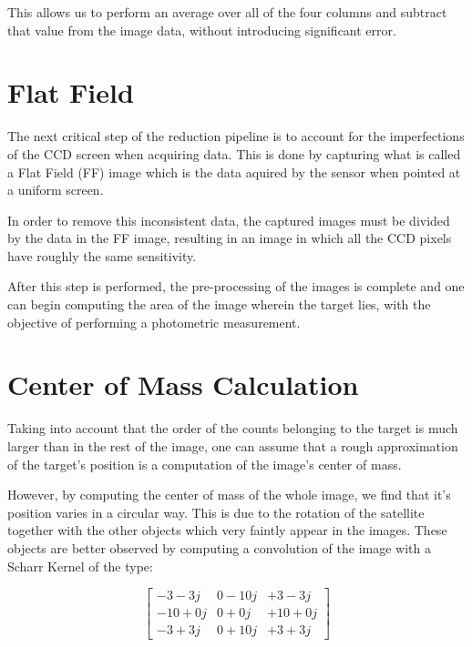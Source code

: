 \documentclass{aa}
\begin{document}
This allows us to perform an average over all of the four columns and subtract that value from the image data, without introducing significant error.

\section{Flat Field}

The next critical step of the reduction pipeline is to account for the imperfections of the CCD screen when acquiring data. This is done by capturing what is called a Flat Field (FF) image which is the data aquired by the sensor when pointed at a uniform screen.

In order to remove this inconsistent data, the captured images must be divided by the data in the FF image, resulting in an image in which all the CCD pixels have roughly the same sensitivity.

After this step is performed, the pre-processing of the images is complete and one can begin computing the area of the image wherein the target lies, with the objective of performing a photometric measurement.

\section{Center of Mass Calculation}

Taking into account that the order of the counts belonging to the target is much larger than in the rest of the image, one can assume that a rough approximation of the target's position is a computation of the image's center of mass.

However, by computing the center of mass of the whole image, we find that it's position varies in a circular way. This is due to the rotation of the satellite together with the other objects which very faintly appear in the images. These objects are better observed by computing a convolution of the image with a Scharr Kernel of the type:

\begin{equation}
\begin{bmatrix}

-3-3j  & 0-10j &  +3 -3j \\
-10+0j & 0+ 0j & +10 +0j \\
-3+3j  & 0+10j &  +3 +3j

\end{bmatrix}
\end{equation}
\end{document}
